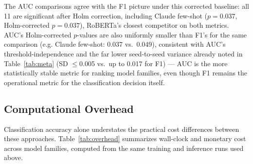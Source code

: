 \documentclass[preprint,12pt]{elsarticle}
\begin{document}
The AUC comparisons agree with the F1 picture under this corrected baseline: all 11 are significant after Holm correction, including Claude few-shot ($p=0.037$, Holm-corrected $p=0.037$), RoBERTa's closest competitor on both metrics. AUC's Holm-corrected $p$-values are also uniformly smaller than F1's for the same comparison (e.g. Claude few-shot: 0.037 vs.\ 0.049), consistent with AUC's threshold-independence and the far lower seed-to-seed variance already noted in Table~\ref{tab:meta} (SD $\le$0.005 vs.\ up to 0.017 for F1) — AUC is the more statistically stable metric for ranking model families, even though F1 remains the operational metric for the classification decision itself.

\subsection{Computational Overhead}
\label{sec:overhead}

Classification accuracy alone understates the practical cost differences between these approaches. Table~\ref{tab:overhead} summarizes wall-clock and monetary cost across model families, computed from the same training and inference runs used above.
\end{document}

